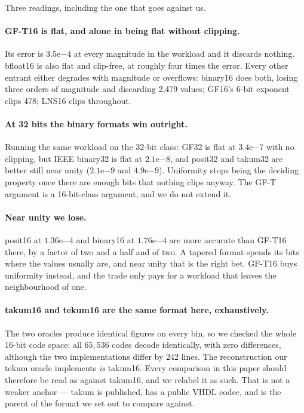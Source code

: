 \documentclass[11pt]{article}
\theoremstyle{definition}
\begin{document}
Three readings, including the one that goes against us.

\paragraph{GF-T16 is flat, and alone in being flat without clipping.} Its error
is $3.5\mathrm{e}{-4}$ at every magnitude in the workload and it discards
nothing. bfloat16 is also flat and clip-free, at roughly four times the error.
Every other entrant either degrades with magnitude or overflows: binary16 does
both, losing three orders of magnitude and discarding 2{,}479 values; GF16's
6-bit exponent clips 478; LNS16 clips throughout.

\paragraph{At 32 bits the binary formats win outright.} Running the same
workload on the 32-bit class: GF32 is flat at $3.4\mathrm{e}{-7}$ with no
clipping, but IEEE binary32 is flat at $2.1\mathrm{e}{-8}$, and posit32 and
takum32 are better still near unity ($2.1\mathrm{e}{-9}$ and
$4.9\mathrm{e}{-9}$). Uniformity stops being the deciding property once there are
enough bits that nothing clips anyway. The GF-T argument is a 16-bit-class
argument, and we do not extend it.

\paragraph{Near unity we lose.} posit16 at $1.36\mathrm{e}{-4}$ and binary16 at
$1.76\mathrm{e}{-4}$ are more accurate than GF-T16 there, by a factor of two and
a half and of two. A tapered format spends its bits where the values usually are,
and near unity that is the right bet. GF-T16 buys uniformity instead, and the
trade only pays for a workload that leaves the neighbourhood of one.

\paragraph{takum16 and tekum16 are the same format here, exhaustively.} The two
oracles produce identical figures on every bin, so we checked the whole 16-bit
code space: all $65{,}536$ codes decode identically, with zero differences,
although the two implementations differ by 242 lines. The reconstruction our
tekum oracle implements \emph{is} takum16. Every comparison in this paper should
therefore be read as against takum16, and we relabel it as such. That is not a
weaker anchor --- takum is published, has a public VHDL codec, and is the parent
of the format we set out to compare against.
\end{document}
